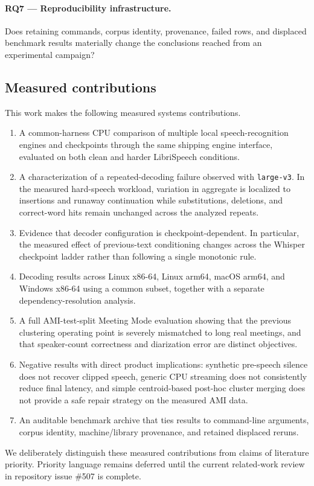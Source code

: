 \paragraph{RQ7 --- Reproducibility infrastructure.}
Does retaining commands, corpus identity, provenance, failed rows, and displaced benchmark
results materially change the conclusions reached from an experimental campaign?

\subsection{Measured contributions}

This work makes the following measured systems contributions.

\begin{enumerate}
  \item A common-harness CPU comparison of multiple local speech-recognition engines and
  checkpoints through the same shipping \YazSes{} engine interface, evaluated on both clean and
  harder LibriSpeech conditions.

  \item A characterization of a repeated-decoding failure observed with \texttt{large-v3}. In
  the measured hard-speech workload, variation in aggregate \wer{} is localized to insertions and
  runaway continuation while substitutions, deletions, and correct-word hits remain unchanged
  across the analyzed repeats.

  \item Evidence that decoder configuration is checkpoint-dependent. In particular, the measured
  effect of previous-text conditioning changes across the Whisper checkpoint ladder rather than
  following a single monotonic rule.

  \item Decoding results across Linux x86-64, Linux arm64, macOS arm64, and Windows x86-64 using
  a common subset, together with a separate dependency-resolution analysis.

  \item A full AMI-test-split Meeting Mode evaluation showing that the previous clustering
  operating point is severely mismatched to long real meetings, and that speaker-count
  correctness and diarization error are distinct objectives.

  \item Negative results with direct product implications: synthetic pre-speech silence does not
  recover clipped speech, generic CPU streaming does not consistently reduce final latency, and
  simple centroid-based post-hoc cluster merging does not provide a safe repair strategy on the
  measured AMI data.

  \item An auditable benchmark archive that ties results to command-line arguments, corpus
  identity, machine/library provenance, and retained displaced reruns.
\end{enumerate}

We deliberately distinguish these measured contributions from claims of literature priority.
Priority language remains deferred until the current related-work review in repository
issue \#507 is complete.
